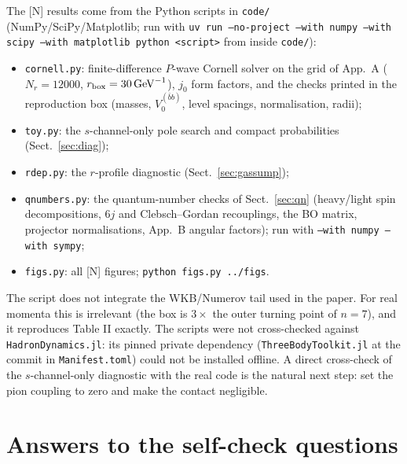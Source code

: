 \documentclass[11pt,a4paper]{article}
\newcommand{\tagN}{\textcolor{red!70!black}{\textsf{\small[N]}}}
\newcommand{\GeV}{\,\mathrm{GeV}}
\begin{document}
The \tagN{} results come from the Python scripts in \texttt{code/} (NumPy/SciPy/Matplotlib; run with \texttt{uv run --no-project --with numpy --with scipy --with matplotlib python <script>} from inside \texttt{code/}):
\begin{itemize}
\item \texttt{cornell.py}: finite-difference $P$-wave Cornell solver on the grid of App.~A ($N_r=12000$, $r_{\rm box}=30\GeV^{-1}$), $j_0$ form factors, and the checks printed in the reproduction box (masses, $V_0^{(\bar bb)}$, level spacings, normalisation, radii);
\item \texttt{toy.py}: the $s$-channel-only pole search and compact probabilities (Sect.~\ref{sec:diag});
\item \texttt{rdep.py}: the $r$-profile diagnostic (Sect.~\ref{sec:gassump});
\item \texttt{qnumbers.py}: the quantum-number checks of Sect.~\ref{sec:qn} (heavy/light spin decompositions, 6$j$ and Clebsch--Gordan recouplings, the BO matrix, projector normalisations, App.~B angular factors); run with \texttt{--with numpy --with sympy};
\item \texttt{figs.py}: all \tagN{} figures; \texttt{python figs.py ../figs}.
\end{itemize}
The script does not integrate the WKB/Numerov tail used in the paper. For real momenta this is irrelevant (the box is $3\times$ the outer turning point of $n=7$), and it reproduces Table II exactly. The scripts were not cross-checked against \texttt{HadronDynamics.jl}: its pinned private dependency (\texttt{ThreeBodyToolkit.jl} at the commit in \texttt{Manifest.toml}) could not be installed offline. A direct cross-check of the $s$-channel-only diagnostic with the real code is the natural next step: set the pion coupling to zero and make the contact negligible.

\section{Answers to the self-check questions}
\label{app:answers}
\end{document}
